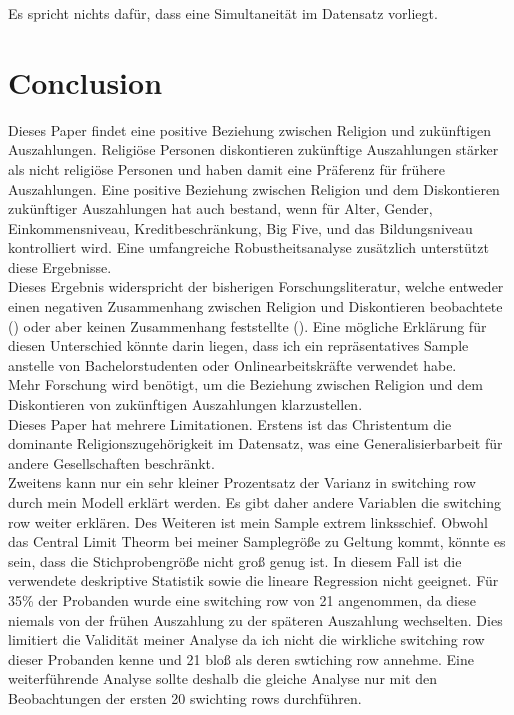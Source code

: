 \documentclass[11pt,a4paper]{article}
\begin{document}
Es spricht nichts dafür, dass eine Simultaneität im Datensatz vorliegt.

\section{Conclusion}
Dieses Paper findet eine positive Beziehung zwischen Religion und zukünftigen Auszahlungen. Religiöse Personen diskontieren zukünftige Auszahlungen stärker als nicht religiöse Personen und haben damit eine Präferenz für frühere Auszahlungen. Eine positive Beziehung zwischen Religion und dem Diskontieren zukünftiger Auszahlungen hat auch bestand, wenn für Alter, Gender, Einkommensniveau, Kreditbeschränkung, Big Five, und das Bildungsniveau kontrolliert wird. Eine umfangreiche Robustheitsanalyse zusätzlich unterstützt  diese Ergebnisse.\\
Dieses Ergebnis widerspricht der bisherigen Forschungsliteratur, welche entweder einen negativen Zusammenhang zwischen Religion und Diskontieren beobachtete (\textcite{carter2012religious}) oder aber keinen Zusammenhang feststellte (\textcite{thornton2015divine, benjamin2013religious}). Eine mögliche Erklärung für diesen Unterschied könnte darin liegen, dass ich ein repräsentatives Sample anstelle von Bachelorstudenten oder Onlinearbeitskräfte verwendet habe.\\
Mehr Forschung wird benötigt, um die Beziehung zwischen Religion und dem Diskontieren von zukünftigen Auszahlungen klarzustellen.\\






Dieses Paper hat mehrere Limitationen. Erstens ist das Christentum die dominante Religionszugehörigkeit im Datensatz, was eine Generalisierbarbeit für andere Gesellschaften beschränkt.\\
Zweitens kann nur ein sehr kleiner Prozentsatz der Varianz in switching row durch mein Modell erklärt werden. Es gibt daher andere Variablen die switching row weiter erklären. Des Weiteren ist mein Sample extrem linksschief. Obwohl das Central Limit Theorm bei meiner Samplegröße zu Geltung kommt, könnte es sein, dass die Stichprobengröße nicht groß genug ist. In diesem Fall ist die verwendete deskriptive Statistik sowie die lineare Regression nicht geeignet. Für 35\% der Probanden wurde eine switching row von 21 angenommen, da diese niemals von der frühen Auszahlung zu der späteren Auszahlung wechselten. Dies limitiert die Validität meiner Analyse da ich nicht die wirkliche switching row dieser Probanden kenne und 21 bloß als deren swtiching row annehme. Eine weiterführende Analyse sollte deshalb die gleiche Analyse nur mit den Beobachtungen der ersten 20 swichting rows durchführen.\\
\end{document}
